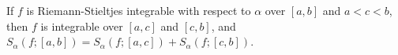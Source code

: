 If $f$ is Riemann-Stieltjes integrable with respect to $\alpha$ over $[a, b]$ and $a < c < b$, then $f$ is integrable over $[a, c]$ and $[c, b]$, and $S_{\alpha}(f; [a, b]) = S_{\alpha}(f; [a, c]) + S_{\alpha}(f; [c, b])$.
